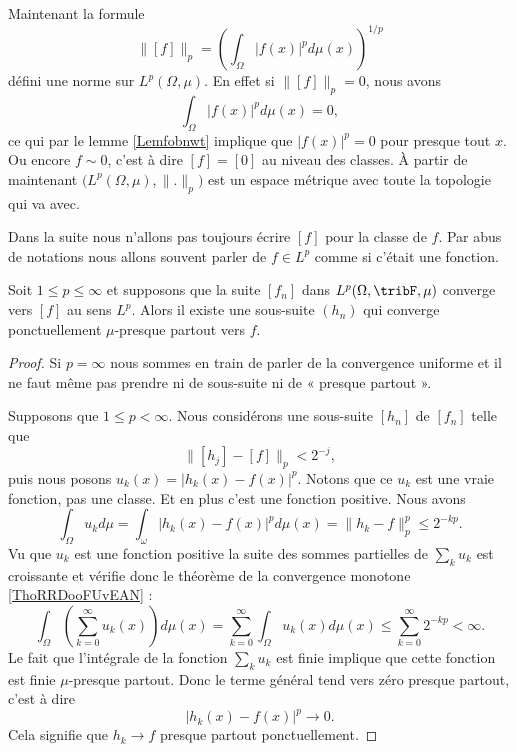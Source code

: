 Maintenant la formule
\begin{equation}
    \| [f] \|_p=\left( \int_{\Omega}| f(x) |^pd\mu(x) \right)^{1/p}
\end{equation}
défini une norme sur \( L^p(\Omega,\mu)\). En effet si \( \| [f] \|_p=0\), nous avons
\begin{equation}
    \int_{\Omega}| f(x) |^pd\mu(x)=0,
\end{equation}
ce qui par le lemme \ref{Lemfobnwt} implique que \( | f(x) |^p=0\) pour presque tout \( x\). Ou encore \( f\sim 0\), c'est à dire \( [f]=[0]\) au niveau des classes. À partir de maintenant \( \big( L^p(\Omega,\mu),\| . \|_p \big)\) est un espace métrique avec toute la topologie qui va avec.

Dans la suite nous n'allons pas toujours écrire \( [f]\) pour la classe de \( f\). Par abus de notations nous allons souvent parler de \( f\in L^p\) comme si c'était une fonction.

\begin{proposition}  \label{PropWoywYG}
    Soit \( 1\leq p\leq \infty\) et supposons que la suite \( [f_n]\) dans \( L^p(\Omega,\tribF,\mu)\) converge vers \( [f]\) au sens \( L^p\). Alors il existe une sous-suite \( (h_n)\) qui converge ponctuellement \( \mu\)-presque partout vers \( f\).
\end{proposition}

\begin{proof}
    Si \( p=\infty\) nous sommes en train de parler de la convergence uniforme et il ne faut même pas prendre ni de sous-suite ni de « presque partout ».

    Supposons que \( 1\leq p<\infty\). Nous considérons une sous-suite \( [h_n]\) de \( [f_n]\) telle que
    \begin{equation}
        \| [h_j]-[f] \|_p<2^{-j},
    \end{equation}
    puis nous posons \( u_k(x)=| h_k(x)-f(x) |^p\). Notons que ce \( u_k\) est une vraie fonction, pas une classe. Et en plus c'est une fonction positive. Nous avons
    \begin{equation}
        \int_{\Omega}u_kd\mu=\int_{\omega}| h_k(x)-f(x) |^pd\mu(x)=\| h_k-f \|_p^p\leq 2^{-kp}.
    \end{equation}
    Vu que \( u_k\) est une fonction positive la suite des sommes partielles de \( \sum_ku_k\) est croissante et vérifie donc le théorème de la convergence monotone \ref{ThoRRDooFUvEAN} :
    \begin{equation}
            \int_{\Omega}\left( \sum_{k=0}^{\infty}u_k(x) \right)d\mu(x)=\sum_{k=0}^{\infty}\int_{\Omega}u_k(x)d\mu(x)
            \leq\sum_{k=0}^{\infty}2^{-kp}<\infty.
    \end{equation}
    Le fait que l'intégrale de la fonction \( \sum_ku_k\) est finie implique que cette fonction est finie \( \mu\)-presque partout. Donc le terme général tend vers zéro presque partout, c'est à dire
    \begin{equation}
        | h_k(x)-f(x) |^p\to 0.
    \end{equation}
    Cela signifie que \( h_k\to f\) presque partout ponctuellement.
\end{proof}

